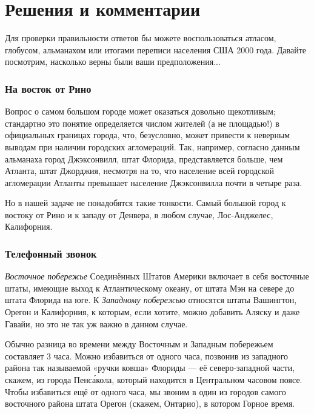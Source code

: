 \section*{Решения и комментарии}

Для проверки правильности ответов бы можете воспользоваться атласом, глобусом, альманахом или итогами переписи населения США 2000 года.
Давайте посмотрим, насколько верны были ваши предположения...

\subsubsection*{На восток от Рино}%

Вопрос о самом большом городе может оказаться довольно щекотливым; 
стандартно это понятие определяется числом жителей (а не площадью!) в официальных границах города, что, безусловно, может привести к неверным выводам
при наличии городских агломераций.
Так, например, согласно данным альманаха город Джэксонвилл, штат Флорида, представляется больше, чем Атланта, штат Джорджия, несмотря на то, что население всей городской агломерации Атланты превышает население Джэксонвилла почти в четыре раза.

\medskip

Но в нашей задаче не понадобятся такие тонкости.
Самый большой город к востоку от Рино и к западу от Денвера, в любом случае, Лос-Анджелес, Калифорния.
\heart

\subsubsection*{Телефонный звонок}%

\emph{Восточное побережье} Соединённых Штатов Америки включает в себя восточные штаты, имеющие выход к Атлантическому океану, от штата Мэн на севере до штата Флорида на юге.
К \emph{Западному побережью} относятся штаты Вашингтон, Орегон и Калифорния,
к которым, если хотите, можно добавить Аляску и даже Гавайи, но это не так уж важно в данном случае. %

Обычно разница во времени между Восточным и Западным побережьем составляет 3 часа.
Можно избавиться от одного часа, позвонив из западного района так называемой «ручки ковша» Флориды --- её северо-западной части, %
скажем, из города Пенс\'{а}кола, который находится в Центральном часовом поясе.
Чтобы избавиться ещё от одного часа, мы звоним в один из городов самого восточного района штата Орегон (скажем, Онтарио), в котором Горное время.

